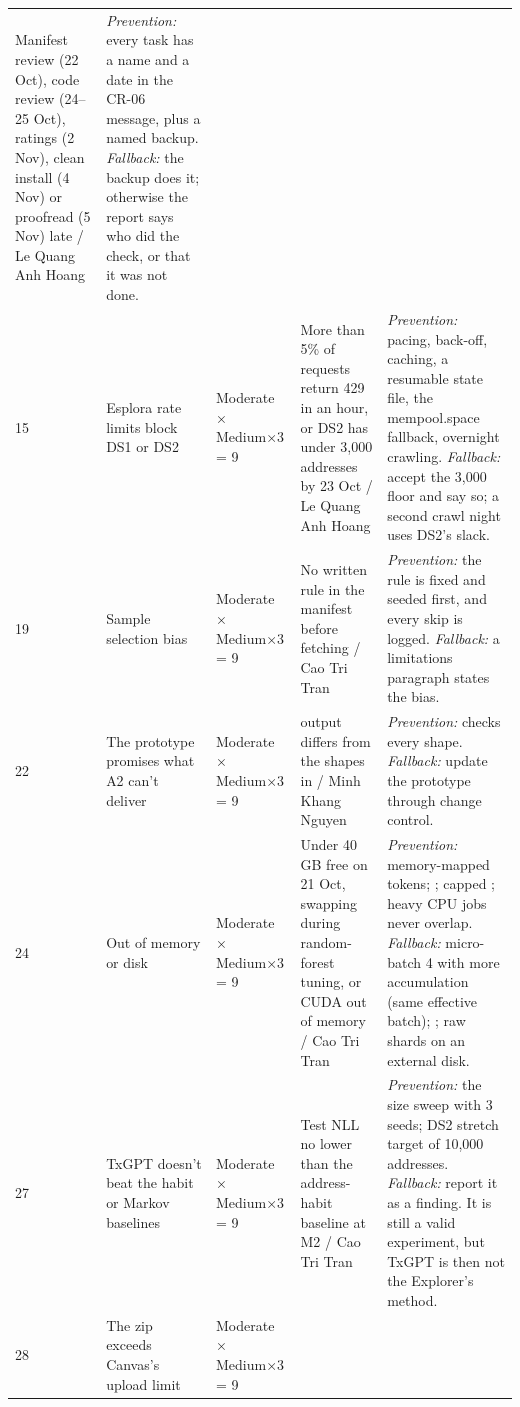 {\begin{longtable}{@{}L{0.7cm}L{3.2cm}L{2.0cm}L{3.4cm}L{4.6cm}@{}}
Manifest review (22 Oct), code review (24--25 Oct), ratings (2 Nov), clean install (4 Nov) or
proofread (5 Nov) late / Le Quang Anh Hoang &
\textit{Prevention:} every task has a name and a date in the CR-06 message, plus a named backup.
\textit{Fallback:} the backup does it; otherwise the report says who did the check, or that it
was not done. \\
15 & Esplora rate limits block DS1 or DS2 & Moderate × Medium×3 = 9 &
More than 5\% of requests return 429 in an hour, or DS2 has under 3,000 addresses by 23 Oct / Le
Quang Anh Hoang &
\textit{Prevention:} pacing, back-off, caching, a resumable state file, the mempool.space fallback,
overnight crawling. \textit{Fallback:} accept the 3,000 floor and say so; a second crawl night
uses DS2's slack. \\
19 & Sample selection bias & Moderate × Medium×3 = 9 &
No written rule in the manifest before fetching / Cao Tri Tran &
\textit{Prevention:} the rule is fixed and seeded first, and every skip is logged.
\textit{Fallback:} a limitations paragraph states the bias. \\
22 & The prototype promises what A2 can't deliver & Moderate × Medium×3 = 9 &
 output differs from the shapes in  / Minh Khang Nguyen &
\textit{Prevention:}  checks every shape. \textit{Fallback:} update the
prototype through change control. \\
24 & Out of memory or disk & Moderate × Medium×3 = 9 &
Under 40 GB free on 21 Oct, swapping during random-forest tuning, or CUDA out of memory / Cao Tri Tran &
\textit{Prevention:} memory-mapped tokens; ; capped ; heavy CPU jobs
never overlap. \textit{Fallback:} micro-batch 4 with more accumulation (same effective batch);
; raw shards on an external disk. \\
27 & TxGPT doesn't beat the habit or Markov baselines & Moderate × Medium×3 = 9 &
Test NLL no lower than the address-habit baseline at M2 / Cao Tri Tran &
\textit{Prevention:} the size sweep with 3 seeds; DS2 stretch target of 10,000 addresses.
\textit{Fallback:} report it as a finding. It is still a valid experiment, but TxGPT is then not
the Explorer's method. \\
28 & The zip exceeds Canvas's upload limit & Moderate × Medium×3 = 9 &

\end{longtable}}
